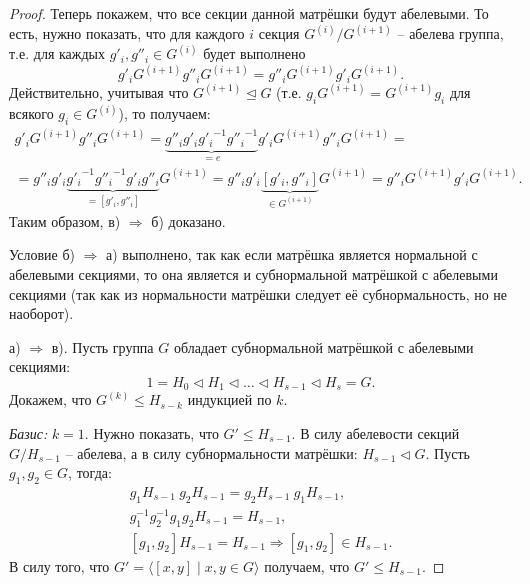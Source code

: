 \documentclass{article}
\begin{document}
\begin{proof}
    Теперь покажем, что все секции данной матрёшки будут абелевыми. То есть, нужно показать, что для каждого $i$ секция $G^{(i)} / G^{(i + 1)}$ -- абелева группа, т.е. для каждых $g'_i, g''_i \in G^{(i)}$ будет выполнено $$ g'_i G^{(i + 1)} g''_i G^{(i + 1)} = g''_i G^{(i + 1)} g'_i G^{(i + 1)}. $$
    Действительно, учитывая что $G^{(i + 1)} \trianglelefteq G$ (т.е. $g_i G^{(i + 1)} = G^{(i + 1)} g_i$ для всякого $g_i \in G^{(i)}$), то получаем:
    \begin{gather*}
        g'_i G^{(i + 1)} g''_i G^{(i + 1)} = \underbrace{g''_i g'_i {g'_i}^{-1} {g''_i}^{-1}}_{=e} g'_i G^{(i + 1)} g''_i G^{(i + 1)} = \\
        = g''_i g'_i \underbrace{{g'_i}^{-1} {g''_i}^{-1} g'_i g''_i}_{=[g'_i, g''_i]} G^{(i + 1)} = g''_i g'_i \underbrace{[g'_i, g''_i]}_{\in G^{(i + 1)}} G^{(i + 1)} = g''_i G^{(i + 1)} g'_i G^{(i + 1)}.
    \end{gather*}
    Таким образом, в) $\Rightarrow$ б) доказано.

    Условие б) $\Rightarrow$ а) выполнено, так как если матрёшка является нормальной с абелевыми секциями, то она является и субнормальной матрёшкой с абелевыми секциями (так как из нормальности матрёшки следует её субнормальность, но не наоборот). 

    а) $\Rightarrow$ в). Пусть группа $G$ обладает субнормальной матрёшкой с абелевыми секциями:
    \begin{equation} \tag{*} \label{orads}
        1 = H_0 \triangleleft H_1 \triangleleft \ldots \triangleleft H_{s - 1} \triangleleft H_s = G.
    \end{equation}
    Докажем, что $G^{(k)} \leqslant H_{s - k}$ индукцией по $k$.

    \textit{Базис:} $k = 1$. Нужно показать, что $G' \leqslant H_{s - 1}$. В силу абелевости секций $G / H_{s - 1}$ -- абелева, а в силу субнормальности матрёшки: $H_{s - 1} \triangleleft G$. Пусть $g_1, g_2 \in G$, тогда:
    \begin{gather*}
        g_1 H_{s - 1} \ g_2 H_{s - 1} = g_2 H_{s - 1} \ g_1 H_{s - 1}, \\
        g_1^{-1} g_2^{-1} g_1 g_2 H_{s - 1} = H_{s - 1}, \\
        [g_1, g_2] H_{s - 1} = H_{s - 1} \Rightarrow [g_1, g_2] \in H_{s - 1}.
    \end{gather*}
    В силу того, что $G' = \langle [x, y] \mid x, y \in G \rangle$ получаем, что $G' \leqslant H_{s - 1}$.


\end{proof}
\end{document}

